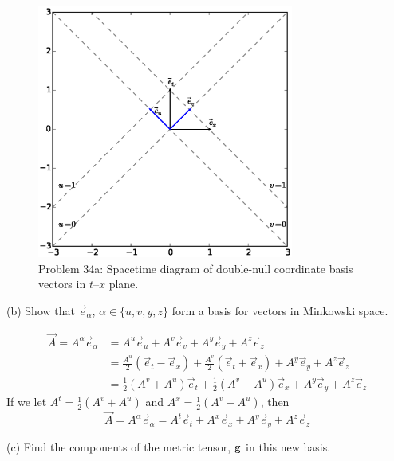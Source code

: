 \documentclass[gr-notes.tex]{subfiles}
\begin{document}
\begin{figure}[b]
  \centering
  \includegraphics[width=0.75\textwidth]{img/ch3_problem_34a}
  \caption{Problem 34a: Spacetime diagram of double-null coordinate basis
    vectors in $t$--$x$ plane.}
  \label{fig:ch3-problem-34a}
\end{figure}

(b)
Show that $\vec{e}_\alpha$, $\alpha \in \{ u, v, y, z \}$ form a basis for vectors in Minkowski space.

\begin{align*}
  \vec{A} = A^\alpha \vec{e}_\alpha &=
  A^u \vec{e}_u + A^v \vec{e}_v + A^y \vec{e}_y + A^z \vec{e}_z
  \\ &=
  \frac{A^u}{2} (\vec{e}_t - \vec{e}_x) +
  \frac{A^v}{2} (\vec{e}_t + \vec{e}_x) +
  A^y \vec{e}_y + A^z \vec{e}_z
  \\ &=
  \frac{1}{2} (A^v + A^u) \vec{e}_t +
  \frac{1}{2} (A^v - A^u) \vec{e}_x +
  A^y \vec{e}_y + A^z \vec{e}_z
\end{align*}
%
If we let $A^t = \frac{1}{2} (A^v + A^u)$ and $A^x = \frac{1}{2} (A^v - A^u)$, then
%
\begin{displaymath}
  \vec{A} =
  A^\alpha \vec{e}_\alpha =
  A^t \vec{e}_t + A^x \vec{e}_x + A^y \vec{e}_y + A^z \vec{e}_z
\end{displaymath}

(c)
Find the components of the metric tensor, $\vb{g}$ in this new basis.
\end{document}
